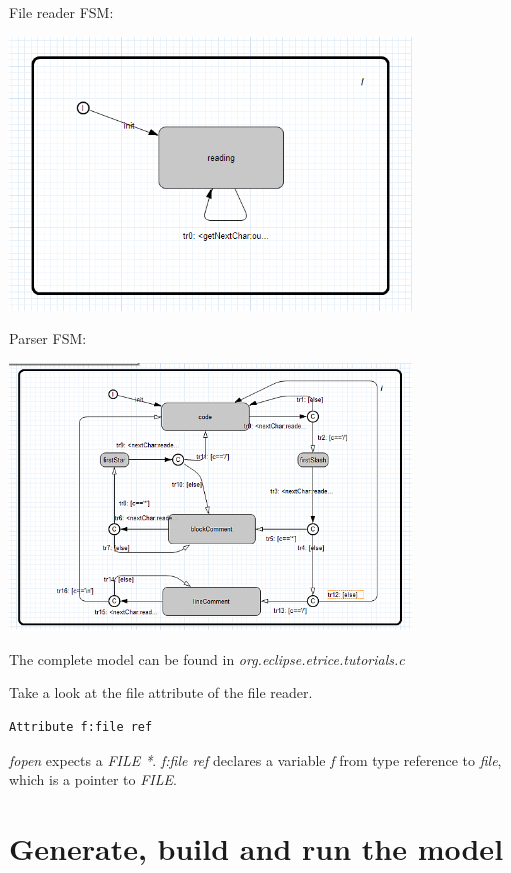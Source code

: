 File reader FSM:

\includegraphics[width=0.8\textwidth]{images/036-RemoveCommentC05.png}

Parser FSM:

\includegraphics[width=0.8\textwidth]{images/036-RemoveCommentC06.png}

The complete model can be found in \textit{org.eclipse.etrice.tutorials.c}

Take a look at the file attribute of the file reader. 

\begin{verbatim}
Attribute f:file ref
\end{verbatim}

\textit{fopen} expects a \textit{FILE *}. \textit{f:file ref} declares a variable \textit{f} from type 
reference to \textit{file}, which is a pointer to \textit{FILE}.


\section{Generate, build and run the model}

